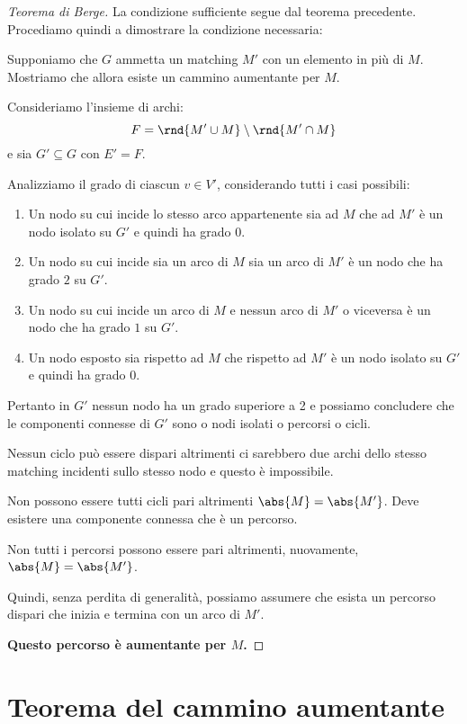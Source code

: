 \documentclass[\main/main.tex]{subfiles}
\begin{document}
\begin{proof}[Teorema di Berge]
	La condizione sufficiente segue dal teorema precedente. Procediamo quindi a dimostrare la condizione necessaria:

	Supponiamo che \(G\) ammetta un matching \(M'\) con un elemento in più di \(M\). Mostriamo che allora esiste un cammino aumentante per \(M\).

	Consideriamo l'insieme di archi:
	\[
		F = \rnd{M'\cup M}\setminus\rnd{M' \cap M}
	\]
	e sia \(G' \subseteq G\) con \(E' = F\).

	Analizziamo il grado di ciascun \(v \in V'\), considerando tutti i casi possibili:
	\begin{enumerate}
		\item Un nodo su cui incide lo stesso arco appartenente sia ad \(M\) che ad \(M'\) è un nodo isolato su \(G'\) e quindi ha grado \(0\).
		\item Un nodo su cui incide sia un arco di \(M\) sia un arco di \(M'\) è un nodo che ha grado \(2\) su \(G'\).
		\item Un nodo su cui incide un arco di \(M\) e nessun arco di \(M'\) o viceversa è un nodo che ha grado \(1\) su \(G'\).
		\item Un nodo esposto sia rispetto ad \(M\) che rispetto ad \(M'\) è un nodo isolato su \(G'\) e quindi ha grado \(0\).
	\end{enumerate}
	Pertanto in \(G'\) nessun nodo ha un grado superiore a 2 e possiamo concludere che le componenti connesse di \(G'\) sono o nodi isolati o percorsi o cicli.

	Nessun ciclo può essere dispari altrimenti ci sarebbero due archi dello stesso matching incidenti sullo stesso nodo e questo è impossibile.

	Non possono essere tutti cicli pari altrimenti \(\abs{M} = \abs{M'}\). Deve esistere una componente connessa che è un percorso.

	Non tutti i percorsi possono essere pari altrimenti, nuovamente, \(\abs{M} = \abs{M'}\).

	Quindi, senza perdita di generalità, possiamo assumere che esista un percorso dispari che inizia e termina con un arco di \(M'\).

	\textbf{Questo percorso è aumentante per \(M\).}
\end{proof}
\clearpage
\section{Teorema del cammino aumentante}
\end{document}
